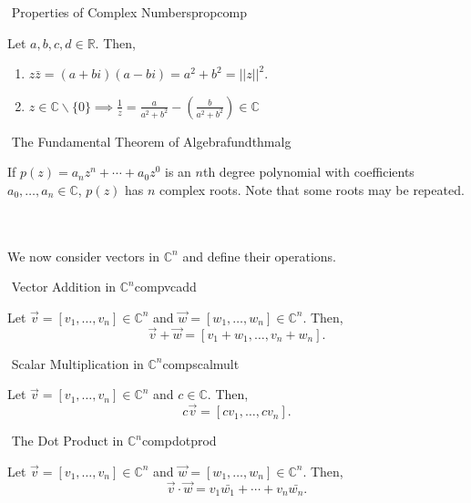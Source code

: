         \begin{theorem}{\Stop\,\,Properties of Complex Numbers}{propcomp}
            
            Let \(a,b,c,d\in\mathbb{R}\). Then,
            \begin{enumerate}
                \item \(z\bar{z}=(a+bi)(a-bi)=a^2+b^2=||z||^2\).
                \item \(z\in\mathbb{C}\backslash \{0\}\implies\frac{1}{z}=\frac{a}{a^2+b^2}-\left(\frac{b}{a^2+b^2}\right)\in\mathbb{C}\)
            \end{enumerate}

        \end{theorem}
        \begin{theorem}{\Stop\,\,The Fundamental Theorem of Algebra}{fundthmalg}
            
            If \(p(z)=a_nz^n+\cdots+a_0z^0\) is an \(n\)th degree polynomial with coefficients \(a_0,\ldots,a_n\in\mathbb{C}\), \(p(z)\) has \(n\) complex roots. Note that some roots may be repeated.

        \end{theorem}
        \pagebreak
        \vphantom
        \\
        \\
        We now consider vectors in \(\mathbb{C}^n\) and define their operations.
        \begin{definition}{\Stop\,\,Vector Addition in \(\mathbb{C}^n\)}{compvcadd}

            Let \(\vec{v}=[v_1,\ldots,v_n]\in\mathbb{C}^n\) and \(\vec{w}=[w_1,\ldots,w_n]\in\mathbb{C}^n\). Then,
            \begin{equation*}
                \vec{v}+\vec{w}=[v_1+w_1,\ldots,v_n+w_n].
            \end{equation*}

        \end{definition}
        \begin{definition}{\Stop\,\,Scalar Multiplication in \(\mathbb{C}^n\)}{compscalmult}

            Let \(\vec{v}=[v_1,\ldots,v_n]\in\mathbb{C}^n\) and \(c\in\mathbb{C}\). Then,
            \begin{equation*}
                c\vec{v}=[cv_1,\ldots,cv_n].
            \end{equation*}

        \end{definition}
        \begin{definition}{\Stop\,\,The Dot Product in \(\mathbb{C}^n\)}{compdotprod}

            Let \(\vec{v}=[v_1,\ldots,v_n]\in\mathbb{C}^n\) and \(\vec{w}=[w_1,\ldots,w_n]\in\mathbb{C}^n\). Then,
            \begin{equation*}
                \vec{v}\cdot\vec{w}=v_1\bar{w_1}+\cdots+v_n\bar{w_n}.
            \end{equation*}

        \end{definition}
